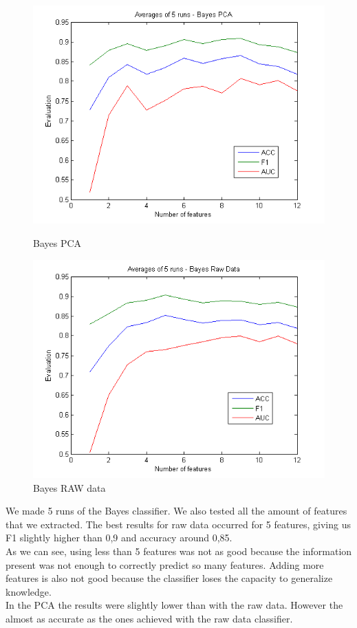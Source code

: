 \documentclass[english, a4paper, 12pt]{article}
\newcommand{\tab}{\hspace*{2em}}
\begin{document}
\begin{figure}[H]
	\centering
	\begin{minipage}[b]{0.45\linewidth}
		\includegraphics[scale= 0.5]{bayes_pca.png}
		\caption{Bayes PCA}
		\label{fig:minipage1}
	\end{minipage}
	\quad
	\begin{minipage}[b]{0.45\linewidth}
		\includegraphics[scale= 0.5]{bayes_raw_data.png}
		\caption{Bayes RAW data}
		\label{fig:minipage2}
	\end{minipage}
\end{figure}

\tab We made 5 runs of the Bayes classifier. We also tested all the amount of features that we extracted. The best results for raw data occurred for 5 features, giving us F1 slightly higher than 0,9 and accuracy around 0,85.\smallskip\\
\tab As we can see, using less than 5 features was not as good because the information present was not enough to correctly predict so many features. Adding more features is also not good because the classifier loses the capacity to generalize knowledge.\smallskip\\
\tab In the PCA the results were slightly lower than with the raw data. However the almost as accurate as the ones achieved with the raw data classifier.\smallskip\\
\end{document}
